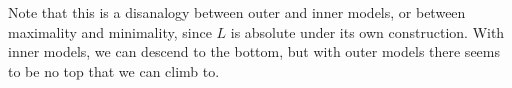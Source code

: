 \documentclass[letterpaper,12pt]{article}
\begin{document}
Note that this is a disanalogy between outer and inner models, or between maximality and minimality, since $L$ is absolute under its own construction. With inner models, we can descend to the bottom, but with outer models there seems to be no top that we can climb to.







\end{document}
